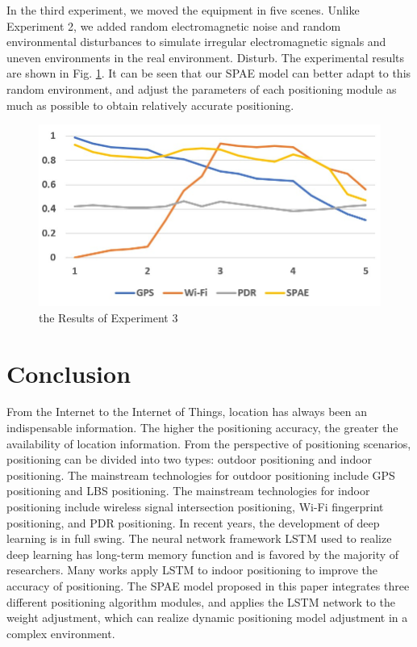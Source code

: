 \documentclass[conference]{IEEEtran}
\begin{document}
In the third experiment, we moved the equipment in five scenes. Unlike Experiment 2, we added random electromagnetic noise and random environmental disturbances to simulate irregular electromagnetic signals and uneven environments in the real environment. Disturb. The experimental results are shown in Fig. \ref{fig:e3}. It can be seen that our SPAE model can better adapt to this random environment, and adjust the parameters of each positioning module as much as possible to obtain relatively accurate positioning.

\begin{figure}[h]
	\centering
	\includegraphics[scale=0.5]{./figures/e3.jpg}
	\caption{the Results of Experiment 3}
	\label{fig:e3}
\end{figure}

\section{Conclusion}
From the Internet to the Internet of Things, location has always been an indispensable information. The higher the positioning accuracy, the greater the availability of location information. From the perspective of positioning scenarios, positioning can be divided into two types: outdoor positioning and indoor positioning. The mainstream technologies for outdoor positioning include GPS positioning and LBS positioning. The mainstream technologies for indoor positioning include wireless signal intersection positioning, Wi-Fi fingerprint positioning, and PDR positioning. In recent years, the development of deep learning is in full swing. The neural network framework LSTM used to realize deep learning has long-term memory function and is favored by the majority of researchers. Many works apply LSTM to indoor positioning to improve the accuracy of positioning. The SPAE model proposed in this paper integrates three different positioning algorithm modules, and applies the LSTM network to the weight adjustment, which can realize dynamic positioning model adjustment in a complex environment.
\end{document}

